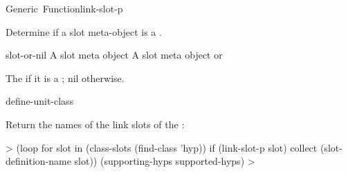 \documentclass[10pt,twoside,english,pdftex]{article}
\begin{document}
\begin{functiondoc}{Generic~Function}{link-slot-p}{
    \returns{} }

\fnsyntax

\fnpurpose Determine if a slot meta-object is a .

\fnmethods
{}

\fnpackage {}

\fnmodule {}

\fnargs
\begin{args}{slot-or-nil}
\arg[slot] A slot meta object
 A slot meta object or \nil{}
\end{args}

\fnreturns The  if it is a ; nil otherwise.

\begin{alsos}{define-unit-class}
\end{alsos}

\fnexample
Return the names of the link slots of the  :
%
\W\supp
\begin{example}
  > (loop for slot in (class-slots (find-class 'hyp)) 
       if (link-slot-p slot) collect (slot-definition-name slot))
  (supporting-hyps supported-hyps)
  >
\end{example}

\end{functiondoc}

\end{document}
